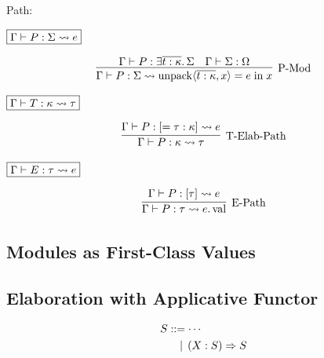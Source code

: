 Path:

$\fbox{$\Gamma \vdash P: \Sigma \rightsquigarrow e$}$

\begin{gather*}
  \infer[\text{P-Mod}]{\Gamma \vdash P: \Sigma \elaborate \symunpack\langle \overline{t: \kappa}, x\rangle = e \symin x}{
    \Gamma \vdash P: \exists \overline{t: \kappa}\ldotp \Sigma
    &
    \Gamma \vdash \Sigma: \Omega
  }
\end{gather*}

$\fbox{$\Gamma \vdash T: \kappa \rightsquigarrow \tau$}$

\begin{gather*}
  \infer[\text{T-Elab-Path}]{\Gamma \vdash P: \kappa \elaborate \tau}{
    \Gamma \vdash P: [= \tau: \kappa] \elaborate e
  }
\end{gather*}

$\fbox{$\Gamma \vdash E: \tau \rightsquigarrow e$}$

\begin{gather*}
  \infer[\text{E-Path}]{\Gamma \vdash P: \tau \elaborate e.\symval}{
    \Gamma \vdash P: [\tau] \elaborate e
  }
\end{gather*}

\subsection{Modules as First-Class Values}

\subsection{Elaboration with Applicative Functor}

\begin{align*}
  S
  &\BNFassign \cdots \\
  &\BNFor (X: S) \Rightarrow S
\end{align*}

